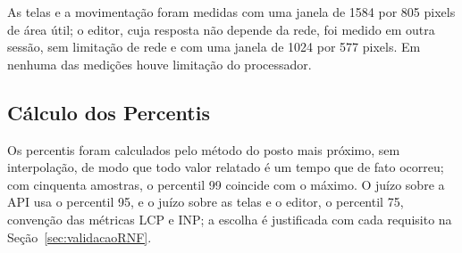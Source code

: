 As telas e a movimentação foram medidas com uma janela de 1584 por 805 pixels de área útil; o editor, cuja resposta não depende da rede, foi medido em outra sessão, sem limitação de rede e com uma janela de 1024 por 577 pixels. Em nenhuma das medições houve limitação do processador.

\subsection{Cálculo dos Percentis}

Os percentis foram calculados pelo método do posto mais próximo, sem interpolação, de modo que todo valor relatado é um tempo que de fato ocorreu; com cinquenta amostras, o percentil 99 coincide com o máximo. O juízo sobre a API usa o percentil 95, e o juízo sobre as telas e o editor, o percentil 75, convenção das métricas LCP e INP; a escolha é justificada com cada requisito na Seção~\ref{sec:validacaoRNF}.
